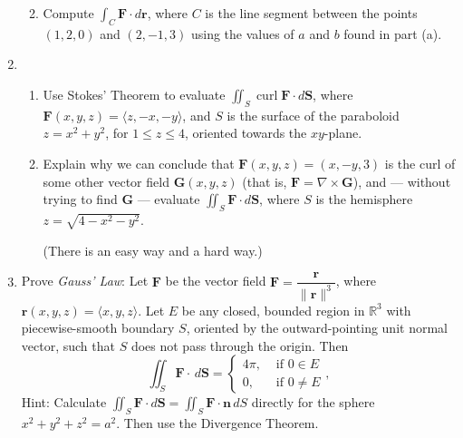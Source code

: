 \documentclass[12pt]{article}
\newcommand{\points}[1]{\marginpar{\hspace{24pt}[#1]}}
\newcommand{\R}{\mathbb{R}}
\renewcommand{\S}{\mathbf{S}}
\renewcommand{\r}{\mathbf{r}}
\newcommand{\dotp}{\,\boldsymbol{\cdot}\,}
\newcommand{\di}{\displaystyle}
\newcommand{\F}{\mathbf{F}}
\newcommand{\G}{\mathbf{G}}
\DeclareMathOperator{\curl}{curl}
\begin{document}
\begin{enumerate}
\begin{enumerate}
\vspace{4in}

\item Compute $\di \int_C \F\dotp d\r$, where $C$ is the line segment between the points $(1,2,0)$ and $(2,-1,3)$
using the values of $a$ and $b$ found in part (a). \points{4}
\end{enumerate}
\newpage

\item 
\begin{enumerate}
\item Use Stokes' Theorem to evaluate $\di \iint_S \curl\F\dotp d\S$, where $\F(x,y,z) = \langle z,-x,-y\rangle$, and $S$ is the surface of the paraboloid $z=x^2+y^2$, for $1\leq z\leq 4$, oriented towards the $xy$-plane. \points{10}

\vspace{3.5in}


\item Explain why we can conclude that $\F(x,y,z) = (x,-y,3)$ is the curl of some other vector field $\G(x,y,z)$ (that is, $\F = \nabla\times \G$), and --- without trying to find $\G$ --- evaluate $\di \iint_S \F\dotp d\S$, where $S$ is the hemisphere $z=\sqrt{4-x^2-y^2}$. \points{6} 

(There is an easy way and a hard way.)

\end{enumerate}
\newpage

%
%
\item Prove {\em Gauss' Law}: Let $\F$ be the vector field $\F = \dfrac{\r}{\lVert\r\rVert^3}$, where $\r(x,y,z) = \langle x,y,z\rangle$. Let $E$ be any closed, bounded region in $\R^3$ with piecewise-smooth boundary $S$, oriented by the outward-pointing unit normal vector, such that $S$ does not pass through the origin. Then\points{12}
\[
\iint_S \F\dotp \,d\S = \begin{cases} 4\pi, & \text{ if } 0\in E\\ 0, & \text{ if } 0\neq E\end{cases},
\]
Hint: Calculate $\iint_S \F\dotp d\S = \iint_S \F\dotp \mathbf{n}\,dS$ directly for the sphere $x^2+y^2+z^2=a^2$. Then use the Divergence Theorem.
\end{enumerate}
\end{document}
